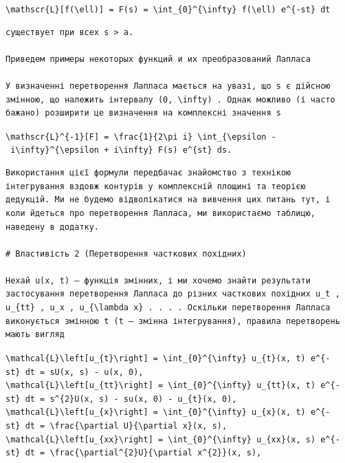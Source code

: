 \documentclass[
  ukrainian,
]{article}
\begin{document}
\texttt{\textbackslash{}mathscr\{L\}{[}f(\textbackslash{}ell){]}\ =\ F(s)\ =\ \textbackslash{}int\_\{0\}\^{}\{\textbackslash{}infty\}\ f(\textbackslash{}ell)\ e\^{}\{-st\}\ dt}

\begin{verbatim}
существует при всех s > a.

Приведем примеры некоторых функций и их преобразований Лапласа

У визначенні перетворення Лапласа мається на увазі, що s є дійсною змінною, що належить інтервалу (0, \infty) . Однак можливо (і часто бажано) розширити це визначення на комплексні значення s
\end{verbatim}

\texttt{\textbackslash{}mathscr\{L\}\^{}\{-1\}{[}F{]}\ =\ \textbackslash{}frac\{1\}\{2\textbackslash{}pi\ i\}\ \textbackslash{}int\_\{\textbackslash{}epsilon\ -\ i\textbackslash{}infty\}\^{}\{\textbackslash{}epsilon\ +\ i\textbackslash{}infty\}\ F(s)\ e\^{}\{st\}\ ds.}

\begin{verbatim}
Використання цієї формули передбачає знайомство з технікою інтегрування вздовж контурів у комплексній площині та теорією дедукцій. Ми не будемо відволікатися на вивчення цих питань тут, і коли йдеться про перетворення Лапласа, ми використаємо таблицю, наведену в додатку.

# Властивість 2 (Перетворення часткових похідних)

Нехай u(x, t) — функція змінних, і ми хочемо знайти результати застосування перетворення Лапласа до різних часткових похідних u_t , u_{tt} , u_x , u_{\lambda x} . . . . Оскільки перетворення Лапласа виконується змінною t (t — змінна інтегрування), правила перетворень мають вигляд
\end{verbatim}

\texttt{\textbackslash{}mathcal\{L\}\textbackslash{}left{[}u\_\{t\}\textbackslash{}right{]}\ =\ \textbackslash{}int\_\{0\}\^{}\{\textbackslash{}infty\}\ u\_\{t\}(x,\ t)\ e\^{}\{-st\}\ dt\ =\ sU(x,\ s)\ -\ u(x,\ 0),}
\texttt{\textbackslash{}mathcal\{L\}\textbackslash{}left{[}u\_\{tt\}\textbackslash{}right{]}\ =\ \textbackslash{}int\_\{0\}\^{}\{\textbackslash{}infty\}\ u\_\{tt\}(x,\ t)\ e\^{}\{-st\}\ dt\ =\ s\^{}\{2\}U(x,\ s)\ -\ su(x,\ 0)\ -\ u\_\{t\}(x,\ 0),}
\texttt{\textbackslash{}mathcal\{L\}\textbackslash{}left{[}u\_\{x\}\textbackslash{}right{]}\ =\ \textbackslash{}int\_\{0\}\^{}\{\textbackslash{}infty\}\ u\_\{x\}(x,\ t)\ e\^{}\{-st\}\ dt\ =\ \textbackslash{}frac\{\textbackslash{}partial\ U\}\{\textbackslash{}partial\ x\}(x,\ s),}
\texttt{\textbackslash{}mathcal\{L\}\textbackslash{}left{[}u\_\{xx\}\textbackslash{}right{]}\ =\ \textbackslash{}int\_\{0\}\^{}\{\textbackslash{}infty\}\ u\_\{xx\}(x,\ s)\ e\^{}\{-st\}\ dt\ =\ \textbackslash{}frac\{\textbackslash{}partial\^{}\{2\}U\}\{\textbackslash{}partial\ x\^{}\{2\}\}(x,\ s),}
\end{document}
